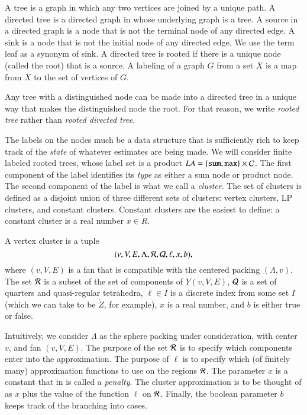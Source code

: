 
\begin{definition}
A tree is a graph in which any two vertices are joined by a unique path.
A directed tree is a directed graph in whose underlying graph is a tree.
A source in a directed graph is a node that is not the terminal node
of any directed edge.  A sink is a node that is not the initial node
of any directed edge.  We use the term leaf as a synonym of sink.
A directed tree is rooted if there is a unique node (called
the root) that is a source.
A labeling of a graph $G$ from a set $X$ is a map from $X$ to the set
of vertices of $G$.
\end{definition}

Any tree with a distinguished node can be made into a directed
tree in a unique way that makes the distinguished node the root. 
For that reason, we write {\it rooted tree} rather than
{\it rooted directed tree}.

The labels on the nodes much be a data structure that is sufficiently
rich to keep track of the {\it state} of whatever estimates are
being made.
We will consider finite labeled rooted trees, whose label set
is a product $LA=\{{\tt sum, max}\} \times {\cal C}$.   The first
component of the label identifies its {\it type} as either a sum
node or product node. 
The second component of the label is what we call a {\it cluster}.
The set of clusters is defined as a disjoint union of three different sets
of clusters:  vertex clusters, LP clusters, and constant clusters.
Constant clusters are the easiest to define: a constant cluster
is a real number $x\in\ring{R}$.  

\begin{definition}
A vertex
cluster is a tuple
    $$
    (v,V,E,\Lambda,{\cal R},{\cal Q},\ell,x,b),
    $$
where $(v,V,E)$ is a fan that is compatible with
the centered packing $(\Lambda,v)$.  
The set ${\cal R}$ is a subset of the set of components of $Y(v,V,E)$,
${\cal Q}$ is a set of quarters and quasi-regular tetrahedra,
$\ell\in I$ is a discrete index from some set $I$ (which we can
take to be $\ring{Z}$, for example), 
$x$ is a real number, and
$b$ is either true or false.
\end{definition}

Intuitively, we consider $\Lambda$ as the sphere packing under
consideration, with center $v$, and fan $(v,V,E)$.
The purpose of the set ${\cal R}$ is to specify which components
enter into the approximation.  The purpose of $\ell$ is to specify
which (of finitely many) approximation functions to use on the
regions ${\cal R}$.  The parameter $x$ is a constant that in \cite{DCG}
is called a {\it penalty}.  The cluster approximation is to be
thought of as $x$ plus the value of the function $\ell$ on ${\cal R}$.
Finally, the boolean parameter $b$ keeps track of the branching into
cases.

